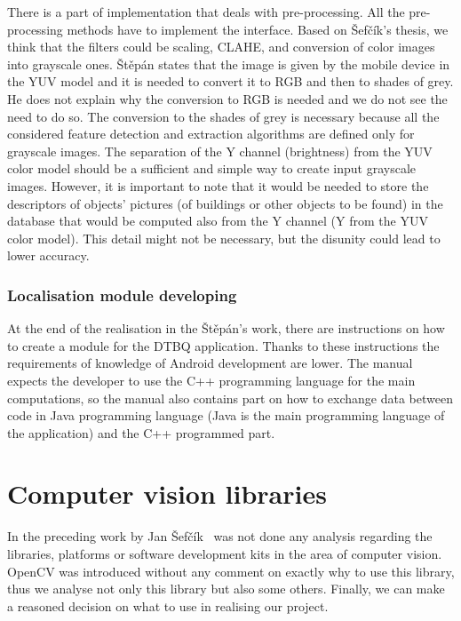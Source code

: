 \documentclass[thesis=B,english]{FITthesis}[2019/12/23]
\begin{document}
                There is a part of implementation that deals with pre-processing. All the pre-processing methods have to implement the interface. Based on Šefčík’s thesis, we think that the filters could be scaling, CLAHE, and conversion of color images into grayscale ones. Štěpán states that the image is given by the mobile device in the YUV model and it is needed to convert it to RGB and then to shades of grey. He does not explain why the conversion to RGB is needed and we do not see the need to do so. The conversion to the shades of grey is necessary because all the considered feature detection and extraction algorithms are defined only for grayscale images. The separation of the Y channel (brightness) from the YUV color model should be a sufficient and simple way to create input grayscale images. However, it is important to note that it would be needed to store the descriptors of objects' pictures (of buildings or other objects to be found) in the database that would be computed also from the Y channel (Y from the YUV color model). This detail might not be necessary, but the disunity could lead to lower accuracy.
                
                \subsubsection*{Localisation module developing}
                At the end of the realisation in the Štěpán’s work, there are instructions on how to create a module for the DTBQ application. Thanks to these instructions the requirements of knowledge of Android development are lower. The manual expects the developer to use the C++ programming language for the main computations, so the manual also contains part on how to exchange data between code in Java programming language (Java is the main programming language of the application) and the C++ programmed part.
                
        \section{Computer vision libraries}
                In the preceding work by Jan Šefčík~\cite{Sefcik2020} was not done any analysis regarding the libraries, platforms or software development kits in the area of computer vision. OpenCV was introduced without any comment on exactly why to use this library, thus we analyse not only this library but also some others. Finally, we can make a reasoned decision on what to use in realising our project.
            
\end{document}
